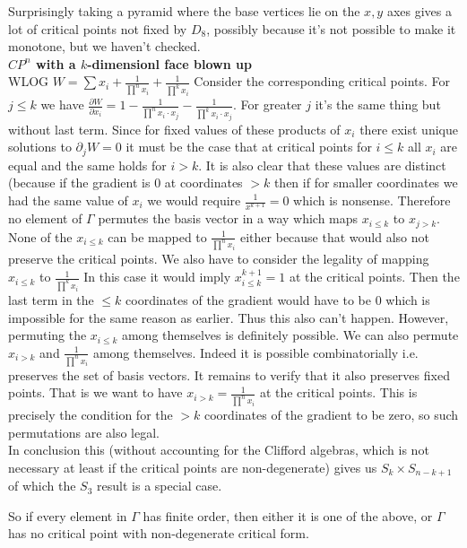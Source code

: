 \documentclass[a4paper]{article}
\begin{document}
 Surprisingly taking a pyramid where the base vertices lie on the  $x,y$ axes gives a lot of critical points not fixed by $D_8$, possibly because it's not possible to make it monotone, but we haven't checked.
 \\
\textbf{$CP^{n} $ with a $k$-dimensionl face blown up}
\\WLOG $W=\sum x_{i}+\frac{1}{\prod ^n x_{i}}+\frac{1}{\prod ^k x_{i}}$
Consider the corresponding critical points. For $j\le k$ we have $\frac{\partial W}{\partial x_{i}} =1-\frac{1}{\prod^n x_{i} \cdot  x_{j}} - \frac{1}{\prod^k x_{i} \cdot x_{j}}$. For greater $j$ it's the same thing but without last term. Since for fixed values of these products of $x_{i}$ there exist unique solutions to $\partial_j W=0$ it must be the case that at critical points for $i\le k$ all $x_{i}$ are equal and the same holds for $i>k$. It is also clear that these values are distinct (because if the gradient is 0 at coordinates $>k$ then if for smaller coordinates we had the same value of  $x_{i}$ we would require $\frac{1}{x^{k+1}}=0$ which is nonsense. Therefore no element of $\Gamma $ permutes the basis vector in a way which maps $x_{i\le k}$ to $x_{j>k}$. None of the $x_{i\le k}$ can be mapped to $\frac{1}{\prod^n x_{i}}$ either because that would also not preserve the critical points. 
We also have to consider the legality of mapping $x_{i\le k}$ to $\frac{1}{\prod^k x_{i}}$ In this case it would imply $x_{i\le k}^{k+1}=1$ at the critical points. Then the last term in the $\le k$ coordinates of the gradient would have to be 0 which is impossible for the same reason as earlier. Thus this also can't happen.
However, permuting the $x_{i\le k}$ among themselves is definitely possible. We can also permute $x_{i>k}$ and $\frac{1}{\prod^{n}x_{i}}$ among themselves. Indeed it is possible combinatorially i.e. preserves the set of basis vectors. It remains to verify that it also preserves fixed points. 
That is we want to have $x_{i>k}=\frac{1}{\prod^{n}x_{i}}$ at the critical points. This is precisely the condition for the $>k$ coordinates of the gradient to be zero, so such permutations are also legal.\\
In conclusion this (without accounting for the Clifford algebras, which is not necessary at least if the critical points are non-degenerate) gives us $S_{k}\times S_{n-k+1}$ of which the $S_3$ result is a special case.


So if every element in $\Gamma$ has finite order, then either it is one of the above, or $\Gamma$ has no critical point with non-degenerate critical form.
\end{document}
